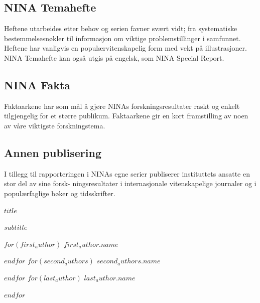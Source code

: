 \documentclass[11pt, a4paper]{article}
\newcommand*\ruleline[1]{\par\noindent\raisebox{.4ex}{\makebox[\linewidth]{\hrulefill\hspace{1ex}\raisebox{-.4ex}{#1}\hspace{1ex}\hrulefill}}}
\begin{document}
\subsection*{\small{NINA Temahefte}}
{\normalsize Heftene utarbeides etter behov og serien favner svært vidt; fra systematiske bestemmelsesnøkler til informasjon om viktige problemstillinger i samfunnet. Heftene har vanligvis en populærvitenskapelig form med vekt på illustrasjoner. NINA Temahefte kan også utgis på engelsk, som NINA Special Report.}

\subsection*{\small{NINA Fakta}}
{\normalsize Faktaarkene har som mål å gjøre NINAs forskningsresultater raskt og enkelt tilgjengelig for et større
publikum. Faktaarkene gir en kort framstilling av noen av våre viktigste forskningstema.}

\subsection*{\small{Annen publisering}}
{\normalsize I tillegg til rapporteringen i NINAs egne serier publiserer instituttets ansatte en stor del av sine forsk- ningsresultater i internasjonale vitenskapelige journaler og i populærfaglige bøker og tidsskrifter.}
\clearpage
{}
\setcounter{page}{1}
\vspace{2cm}

\huge{$title$} \par\vspace{.5cm}
\LARGE{$subtitle$} \par\vspace{1cm}
$for(first_author)$
\hspace{0cm}\LARGE{$first_author.name$} \par
$endfor$
$for(second_authors)$
\LARGE{$second_authors.name$} \par
$endfor$
$for(last_author)$
\LARGE{$last_author.name$} \par
$endfor$

\clearpage
{}
\fancyhf{}
\pagestyle{fancy}
\fancyfoot[c]{\ruleline{\thepage}}
\fancyhead[c]{\ruleline{\tiny{NINA Rapport $reportnr$}}}
\addtocounter{page}{1}
\end{document}
